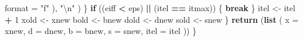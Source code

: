 \documentclass[12pt,]{article}
\newenvironment{Shaded}{\begin{snugshade}}{\end{snugshade}}
\newcommand{\KeywordTok}[1]{\textcolor[rgb]{0.13,0.29,0.53}{\textbf{#1}}}
\newcommand{\DataTypeTok}[1]{\textcolor[rgb]{0.13,0.29,0.53}{#1}}
\newcommand{\DecValTok}[1]{\textcolor[rgb]{0.00,0.00,0.81}{#1}}
\newcommand{\CharTok}[1]{\textcolor[rgb]{0.31,0.60,0.02}{#1}}
\newcommand{\StringTok}[1]{\textcolor[rgb]{0.31,0.60,0.02}{#1}}
\newcommand{\ControlFlowTok}[1]{\textcolor[rgb]{0.13,0.29,0.53}{\textbf{#1}}}
\newcommand{\OperatorTok}[1]{\textcolor[rgb]{0.81,0.36,0.00}{\textbf{#1}}}
\newcommand{\NormalTok}[1]{#1}
\begin{document}
\begin{Shaded}
\begin{Highlighting}[]
            \DataTypeTok{format =} \StringTok{"f"}
\NormalTok{          ),}
          \StringTok{"}\CharTok{\textbackslash{}n}\StringTok{"}
\NormalTok{        )}
\NormalTok{      \}}
      \ControlFlowTok{if}\NormalTok{ ((eiff }\OperatorTok{<}\StringTok{ }\NormalTok{eps) }\OperatorTok{||}\StringTok{ }\NormalTok{(itel }\OperatorTok{==}\StringTok{ }\NormalTok{itmax)) \{}
        \ControlFlowTok{break}
\NormalTok{      \}}
\NormalTok{      itel <-}\StringTok{ }\NormalTok{itel }\OperatorTok{+}\StringTok{ }\DecValTok{1}
\NormalTok{      xold <-}\StringTok{ }\NormalTok{xnew}
\NormalTok{      bold <-}\StringTok{ }\NormalTok{bnew}
\NormalTok{      dold <-}\StringTok{ }\NormalTok{dnew}
\NormalTok{      sold <-}\StringTok{ }\NormalTok{snew}
\NormalTok{    \}}
    \KeywordTok{return}\NormalTok{ (}\KeywordTok{list}\NormalTok{ (}
      \DataTypeTok{x =}\NormalTok{ xnew,}
      \DataTypeTok{d =}\NormalTok{ dnew,}
      \DataTypeTok{b =}\NormalTok{ bnew,}
      \DataTypeTok{s =}\NormalTok{ snew,}
      \DataTypeTok{itel =}\NormalTok{ itel}
\NormalTok{    ))}
\NormalTok{  \}}


\end{Highlighting}
\end{Shaded}
\end{document}
